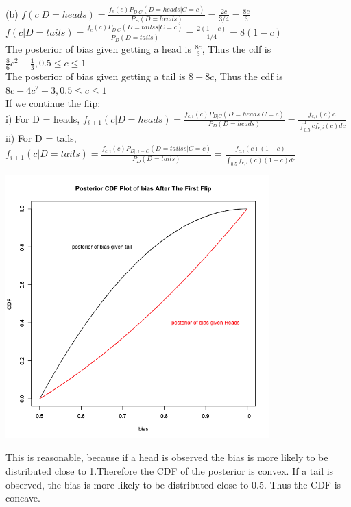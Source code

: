 \documentclass[11pt]{article}
\begin{document}
  (b) $f(c|D = heads) = \frac{f_c(c) P_{D|C}(D = heads| C =c)}{P_D(D = heads)} = \frac{2 c}{3/4 } = \frac{8c}{3}$\\
  $ f(c|D = tails) = \frac{f_c(c) P_{D|C}(D = tailss| C =c)}{P_D(D = tails)} = \frac{2 (1-c)}{1/4 } = 8(1-c)$\\
  The posterior of bias given getting a head is $\frac{8c}{3}$, Thus the cdf is $\frac{8}{6} c^2 -\frac{1}{3}, 0.5 \leq c \leq 1  $\\
  The posterior of bias given getting a tail is $8-8c$, Thus the cdf is $8c - 4c^2 -3, 0.5 \leq c \leq 1  $\\ 
  
  If we continue the flip:\\
  i) For D = heads, $f_{i+1}(c|D = heads) = \frac{f_{c,i}(c) P_{D|C}(D = heads| C =c)}{P_D(D = heads)}  = \frac{f_{c,i}(c) c}{\int_{0.5}^{1} c f_{c,i}(c)dc}$\\
  ii) For D = tails, $ f_{i+1}(c|D = tails) = \frac{f_{c,i}(c) P_{D|, i = C}(D = tailss| C =c)}{P_D(D = tails)} = \frac{f_{c,i}(c)(1-c)}{\int_{0.5}^{1} f_{c,i}(c)(1-c)dc} $\\
    
  \begin{center}
  	\includegraphics[height = 4in]{Q5_2}
  \end{center}
  This is reasonable, because if a head is observed the bias is more likely to be distributed close to 1.Therefore the CDF of the posterior is convex. If a tail is observed, the bias is more likely to be distributed close to 0.5. Thus the CDF is concave.    
  
  
  
 
\end{document}
